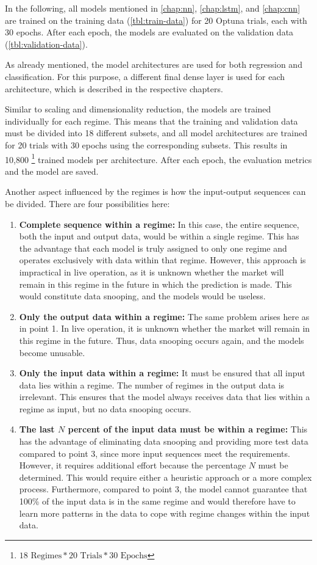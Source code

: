 In the following, all models mentioned in \autoref{chap:nn}, \autoref{chap:lstm}, and \autoref{chap:cnn} are trained on the training data (\autoref{tbl:train-data}) for 20 Optuna trials, each with 30 epochs.
After each epoch, the models are evaluated on the validation data (\autoref{tbl:validation-data}).

As already mentioned, the model architectures are used for both regression and classification.
For this purpose, a different final dense layer is used for each architecture, which is described in the respective chapters.

Similar to scaling and dimensionality reduction, the models are trained individually for each regime.
This means that the training and validation data must be divided into 18 different subsets, and all model architectures are trained for 20 trials with 30 epochs using the corresponding subsets.
This results in 10,800 \footnote{$18 \text{ Regimes} * 20 \text{ Trials} * 30 \text{ Epochs}$} trained models per architecture.
After each epoch, the evaluation metrics and the model are saved.

Another aspect influenced by the regimes is how the input-output sequences can be divided.
There are four possibilities here:

\begin{enumerate}
    \item \textbf{Complete sequence within a regime:} In this case, the entire sequence, both the input and output data, would be within a single regime.
    This has the advantage that each model is truly assigned to only one regime and operates exclusively with data within that regime.
    However, this approach is impractical in live operation, as it is unknown whether the market will remain in this regime in the future in which the prediction is made.
    This would constitute data snooping, and the models would be useless.
    \item \textbf{Only the output data within a regime:} The same problem arises here as in point 1.
    In live operation, it is unknown whether the market will remain in this regime in the future.
    Thus, data snooping occurs again, and the models become unusable.
    \item \textbf{Only the input data within a regime:} It must be ensured that all input data lies within a regime.
    The number of regimes in the output data is irrelevant.
    This ensures that the model always receives data that lies within a regime as input, but no data snooping occurs.
    \item \textbf{The last $N$ percent of the input data must be within a regime:} This has the advantage of eliminating data snooping and providing more test data compared to point 3, since more input sequences meet the requirements.
    However, it requires additional effort because the percentage $N$ must be determined.
    This would require either a heuristic approach or a more complex process.
    Furthermore, compared to point 3, the model cannot guarantee that 100\% of the input data is in the same regime and would therefore have to learn more patterns in the data to cope with regime changes within the input data.
\end{enumerate}

